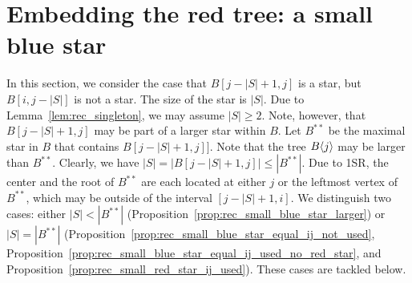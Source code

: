 \documentclass[11pt,a4paper,colorlinks=true,urlcolor=blue,citecolor=red]{article}
\theoremstyle{plain}
\begin{document}
\section{Embedding the red tree: a small blue star}
\label{subsec:rec_small_blue_star}
In this section, we consider the case that $B[j-|S|+1,j]$ is a star, but
$B[i,j-|S|]$ is not a star. The size of the star is $|S|$. Due to
Lemma~\ref{lem:rec_singleton}, we may assume $|S|\geq2$. Note, however,
that $B[j-|S|+1,j]$ may be part of a larger star within $B$. Let
$B^{**}$ be the maximal star in $B$ that contains $B[j-|S|+1,j]]$. Note
that the tree $B\langle{j}\rangle$ may be larger than $B^{**}$. Clearly, we have
$|S|=|B[j-|S|+1,j]|\leq |B^{**}|$. Due to 1SR, the center and the root
of $B^{**}$ are each located at either $j$ or the leftmost vertex of
$B^{**}$, which may be outside of the interval $[j-|S|+1,i]$. We
distinguish two cases: either $|S|<|B^{**}|$
(Proposition~\ref{prop:rec_small_blue_star_larger}) or $|S|=|B^{**}|$
(Proposition~\ref{prop:rec_small_blue_star_equal_ij_not_used},
Proposition~\ref{prop:rec_small_blue_star_equal_ij_used_no_red_star},
and Proposition~\ref{prop:rec_small_red_star_ij_used}). These cases are
tackled below.
\end{document}
